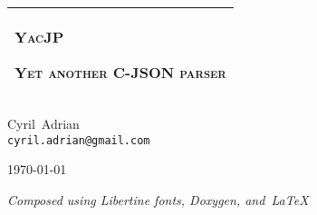 \documentclass[a4paper,twoside,10pt]{book}
\begin{document}
\hypersetup{pageanchor=false,citecolor=blue}
\begin{titlepage}
  \vspace*{3cm}
  \begin{center}
    \begin{tabular}{p{10cm}}
      \hline
      \begin{minipage}[t]{10cm}
        \begin{center}
          \vspace*{2ex}
          {\Huge\textsc{YacJP}}

          \vspace*{1ex}
          {\Large\textsc{Yet another C-JSON parser}}
        \end{center}
      \end{minipage}
      \vspace{1ex}\\
      \hline
    \end{tabular}

    \vspace*{8em}
    {Cyril~{\sc Adrian} \\ \texttt{cyril.adrian@gmail.com}}

    \vspace*{2cm}
    \today

    \vfill
    \emph{\small Composed using Libertine fonts, Doxygen, and~\LaTeX~} \libertinelogo
  \end{center}
\end{titlepage}
\clearemptydoublepage
{}
\tableofcontents
\clearemptydoublepage
{}
\hypersetup{pageanchor=true,citecolor=blue}
\end{document}
